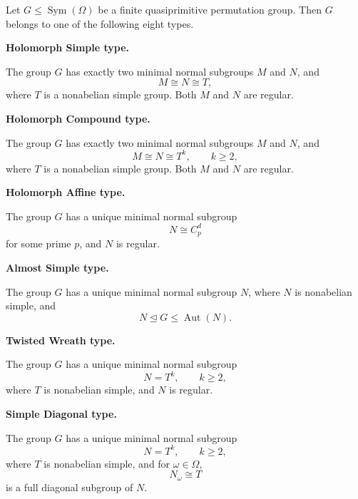 \begin{theorem}
Let \(G\leq \operatorname{Sym}(\Omega)\) be a finite quasiprimitive permutation group.
Then \(G\) belongs to one of the following eight types.

\begin{description}[leftmargin=2.8cm, style=nextline]
    \item[\(\mathrm{HS}\)]
    \textbf{Holomorph Simple type.}

    The group \(G\) has exactly two minimal normal subgroups \(M\) and \(N\), and
    \[
        M\cong N\cong T,
    \]
    where \(T\) is a nonabelian simple group. Both \(M\) and \(N\) are regular.

    \item[\(\mathrm{HC}\)]
    \textbf{Holomorph Compound type.}

    The group \(G\) has exactly two minimal normal subgroups \(M\) and \(N\), and
    \[
        M\cong N\cong T^k,
        \qquad k\geq 2,
    \]
    where \(T\) is a nonabelian simple group. Both \(M\) and \(N\) are regular.

    \item[\(\mathrm{HA}\)]
    \textbf{Holomorph Affine type.}

    The group \(G\) has a unique minimal normal subgroup
    \[
        N\cong C_p^d
    \]
    for some prime \(p\), and \(N\) is regular.

    \item[\(\mathrm{AS}\)]
    \textbf{Almost Simple type.}

    The group \(G\) has a unique minimal normal subgroup \(N\), where \(N\) is nonabelian
    simple, and
    \[
        N\unlhd G\leq \operatorname{Aut}(N).
    \]

    \item[\(\mathrm{TW}\)]
    \textbf{Twisted Wreath type.}

    The group \(G\) has a unique minimal normal subgroup
    \[
        N=T^k,\qquad k\geq 2,
    \]
    where \(T\) is nonabelian simple, and \(N\) is regular.

    \item[\(\mathrm{SD}\)]
    \textbf{Simple Diagonal type.}

    The group \(G\) has a unique minimal normal subgroup
    \[
        N=T^k,\qquad k\geq 2,
    \]
    where \(T\) is nonabelian simple, and for \(\omega\in\Omega\),
    \[
        N_\omega\cong T
    \]
    is a full diagonal subgroup of \(N\).


\end{description}
\end{theorem}
